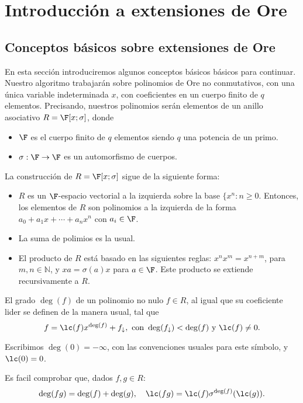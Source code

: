 \chapter{Introducción a extensiones de Ore}%
\label{chap:conceptos_básicos_sobre_códigos_lineales}
\section{Conceptos básicos sobre extensiones de Ore}
En esta sección introduciremos algunos conceptos básicos básicos para continuar. Nuestro algoritmo trabajarán sobre polinomios de Ore no conmutativos, con una única variable indeterminada \(x\), con coeficientes en un cuerpo finito de \(q\) elementos. Precisando, nuestros polinomios serán elementos de un anillo asociativo \(R = \F[x;\sigma]\), donde

\begin{itemize}
    \item \(\F\) es el cuerpo finito de \(q\) elementos siendo \(q\) una potencia de un primo.
    \item \(\sigma: \F \to \F\) es un automorfismo de cuerpos.
\end{itemize}

La construcción de \(R = \F[x;\sigma]\) sigue de la siguiente forma:
\begin{itemize}
    \item \(R\) es un \(\F\)-espacio vectorial a la izquierda sobre la base  \(\{x^n: n \geq 0\). Entonces, los elementos de  \(R\) son polinomios a la izquierda de la forma \(a_0 + a_1 x + \cdots + a_n x^n\) con \(a_i \in \F\).
    \item La suma de polimios es la usual.
    \item El producto de \(R\) está basado en las siguientes reglas: \(x^n x^m = x^{n+m}\), para \(m, n \in \mathbb{N}\), y \(xa = \sigma(a)x\) para  \(a \in \F\). Este producto se extiende recursivamente a \(R\).
\end{itemize}

El grado \(\deg (f)\) de un polinomio no nulo \(f \in R\), al igual que su coeficiente lider se definen de la manera usual, tal que
\[
f = \lc(f)x^{\deg(f)} + f_{\downarrow}, \text{ con } \deg(f_{\downarrow}) < \deg(f) \text{ y } \lc(f) \neq 0
.\]

Escribimos \(\deg(0) = -\infty\), con las convenciones usuales para este símbolo, y \(\lc(0) = 0\).

Es facil comprobar que, dados \(f, g \in R\):
\[
\deg(fg) = \deg(f) + \deg(g), \quad \lc(fg) = \lc(f)\sigma^{\deg(f)}(\lc(g))
.\]

